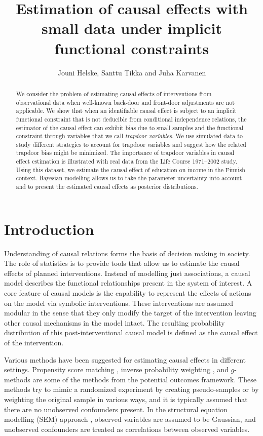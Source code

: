 \documentclass{statsoc}
\title{Estimation of causal effects with small data under implicit functional constraints}
\author[Helske, Tikka, Karvanen]{Jouni Helske, Santtu Tikka and Juha Karvanen}
\newcommand{\+}[1]{\ensuremath{\mathbf{#1}}}
\begin{document}
\maketitle

\begin{abstract}
We consider the problem of estimating causal effects of interventions from observational data when well-known back-door and front-door adjustments are not applicable. We show that when an identifiable causal effect is subject to an implicit functional constraint that is not deducible from conditional independence relations, the estimator of the causal effect can exhibit bias due to small samples and the functional constraint through variables that we call \emph{trapdoor variables}. We use simulated data to study different strategies to account for trapdoor variables and suggest how the related trapdoor bias might be minimized. The importance of trapdoor variables in causal effect estimation is illustrated with real data from the Life Course 1971--2002 study. Using this dataset, we estimate the causal effect of education on income in the Finnish context. Bayesian modelling allows us to take the parameter uncertainty into account and to present the estimated causal effects as posterior distributions.
\end{abstract}



\section{Introduction}
\label{sec:introduction}

Understanding of causal relations forms the basis of decision making in society. The role of statistics is to provide tools that allow us to estimate the causal effects of planned interventions. Instead of modelling just associations, a causal model describes the functional relationships present in the system of interest. A core feature of causal models \citep{Pearl:book2009} is the capability to represent the effects of actions on the model via symbolic interventions. These interventions are assumed modular in the sense that they only modify the target of the intervention leaving other causal mechanisms in the model intact. The resulting probability distribution of this post-interventional causal model is defined as the causal effect of the intervention.

Various methods have been suggested for estimating causal effects in different settings. Propensity score matching \citep{rosenbaum1983, imbens2000}, inverse probability weighting \citep{rosenbaum1983, rosenbaum1987}, and $g$-methods \citep{Robins1992} are some of the methods from the potential outcomes framework. These methods try to mimic a randomized experiment by creating pseudo-samples or by weighting the original sample in various ways, and it is typically assumed that there are no unobserved confounders present. In the structural equation modelling (SEM) approach \citep[see, e.g.,][]{Kline2011}, observed variables are assumed to be Gaussian, and unobserved confounders are treated as correlations between observed variables. 
\end{document}
